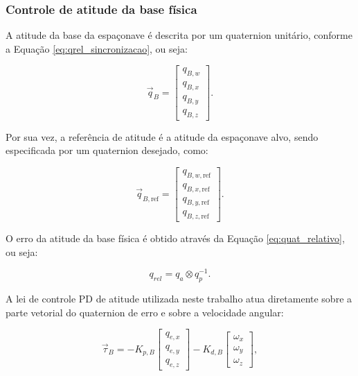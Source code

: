 \subsubsection{Controle de atitude da base física}
\label{sec:controle_PD_atitude}

A atitude da base da espaçonave é descrita por um quaternion unitário, conforme a Equação \eqref{eq:qrel_sincronizacao}, ou seja:

\begin{equation}
\vec q_B =
\begin{bmatrix}
q_{B,w} \\
q_{B,x} \\
q_{B,y} \\
q_{B,z}
\end{bmatrix}.
\end{equation}

Por sua vez, a referência de atitude é a atitude da espaçonave alvo, sendo especificada por um quaternion desejado, como:

\begin{equation}
\vec q_{B,\text{ref}} =
\begin{bmatrix}
q_{B,w,\text{ref}} \\
q_{B,x,\text{ref}} \\
q_{B,y,\text{ref}} \\
q_{B,z,\text{ref}}
\end{bmatrix}.
\end{equation}

O erro da atitude da base física é obtido através da Equação \eqref{eq:quat_relativo}, ou seja:

\begin{equation}
\label{eq:controle_PD_quat}
q_{rel} =
q_a \otimes q_p^{-1}.
\end{equation}

A lei de controle PD de atitude utilizada neste trabalho atua diretamente sobre a parte vetorial do quaternion de erro e sobre a velocidade angular:

\begin{equation}
\vec\tau_B=
-K_{p,B}
\begin{bmatrix}
q_{e,x} \\
q_{e,y} \\
q_{e,z}
\end{bmatrix}
-K_{d,B}
\begin{bmatrix}
\omega_x \\
\omega_y \\
\omega_z
\end{bmatrix},
\label{eq:controle_PD_atitude}
\end{equation}

